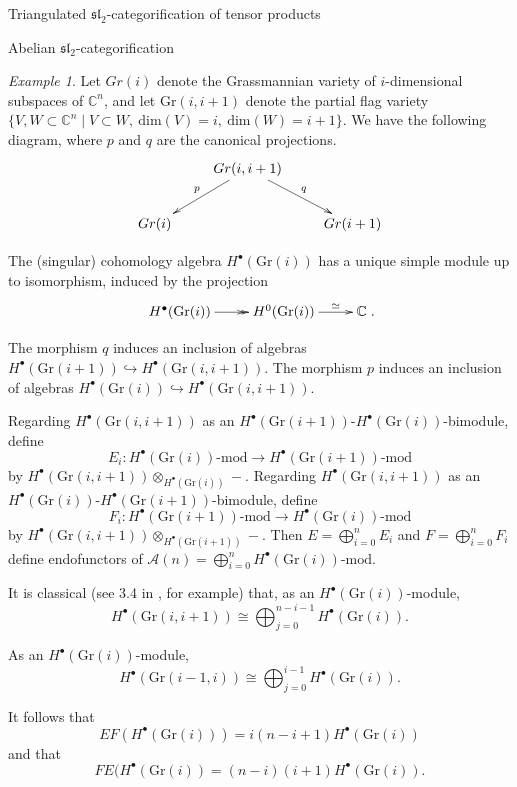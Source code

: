 \documentclass[12pt]{amsart}
\theoremstyle{definition}
\theoremstyle{remark}
\theoremstyle{remark}
\newtheorem{ex}[thm]{Example}
\begin{document}
\begin{section}{Triangulated $\mathfrak{sl}_{2}$-categorification of tensor products}
\begin{subsection}{Abelian $\mathfrak{sl}_{2}$-categorification}
\begin{ex} \label{WeakCatSimps} Let $Gr(i)$ denote the Grassmannian variety of $i$-dimensional subspaces of $\mathbb{C}^{n}$, and let $\text{Gr}(i,i+1)$ denote the partial flag variety $\{ V,W \subset \mathbb{C}^{n} \mid V \subset W, \ \text{dim}(V) = i, \ \text{dim}(W) = i+1 \}$. We have the following diagram, where $p$ and $q$ are the canonical  projections. \[ \xymatrix{ & Gr(i,i+1) \ar[dl]_{p} \ar[dr]^{q} & \\ Gr(i) & & Gr(i+1) } \] 

The (singular) cohomology algebra $H^{\bullet}(\text{Gr}(i))$ has a unique simple module up to isomorphism, induced by the projection \[ \xymatrix{ H^{\bullet}(\text{Gr}(i)) \ar@{->>}[r] & H^{0}(\text{Gr}(i)) \ar[r]^-{\simeq} & \mathbb{C} }. \] 

The morphism $q$ induces an inclusion of algebras $H^{\bullet}(\text{Gr}(i+1)) \hookrightarrow H^{\bullet}(\text{Gr}(i,i+1))$. The morphism $p$ induces an inclusion of algebras $H^{\bullet}(\text{Gr}(i)) \hookrightarrow H^{\bullet}(\text{Gr}(i,i+1))$.

Regarding $H^{\bullet}(\text{Gr}(i,i+1))$ as an $H^{\bullet}(\text{Gr}(i+1))\text{-}H^{\bullet}(\text{Gr}(i))$-bimodule, define \[ E_{i} \colon H^{\bullet}(\text{Gr}(i))\text{-mod} \rightarrow H^{\bullet}(\text{Gr}(i+1))\text{-mod} \] by $H^{\bullet}(\text{Gr}(i,i+1)) \otimes_{H^{\bullet}(\text{Gr}(i))} - $. Regarding $H^{\bullet}(\text{Gr}(i,i+1))$ as an $H^{\bullet}(\text{Gr}(i))\text{-}H^{\bullet}(\text{Gr}(i+1))$-bimodule, define \[ F_{i} \colon H^{\bullet}(\text{Gr}(i+1))\text{-mod} \rightarrow H^{\bullet}(\text{Gr}(i))\text{-mod}\] by $H^{\bullet}(\text{Gr}(i,i+1)) \otimes_{H^{\bullet}(\text{Gr}(i+1))} - $. Then $E = \bigoplus_{i=0}^{n} E_{i}$ and $F = \bigoplus_{i=0}^{n} F_{i}$ define endofunctors of $\mathcal{A}(n) = \bigoplus_{i=0}^{n} H^{\bullet}(\text{Gr}(i))\text{-mod}$.

It is classical (see 3.4 in \cite{FrenkelKhovanovStroppelCategorificationFiniteDimensionalIrreducibleRepresentationsQuantumSl2TensorProducts}, for example) that, as an $H^{\bullet}(\text{Gr}(i))$-module, \[ H^{\bullet}(\text{Gr}(i,i+1)) \cong \bigoplus_{j=0}^{n-i-1} H^{\bullet}(\text{Gr}(i)). \] 

As an $H^{\bullet}(\text{Gr}(i))$-module, \[ H^{\bullet}(\text{Gr}(i-1,i)) \cong \bigoplus_{j=0}^{i-1} H^{\bullet}(\text{Gr}(i)). \] 

It follows that \[ EF(H^{\bullet}(\text{Gr}(i))) = i(n-i+1)H^{\bullet}(\text{Gr}(i)) \] and that \[ FE(H^{\bullet}(\text{Gr}(i)) = (n-i)(i+1)H^{\bullet}(\text{Gr}(i)). \] 


\end{ex}
\end{subsection}
\end{section}
\end{document}
